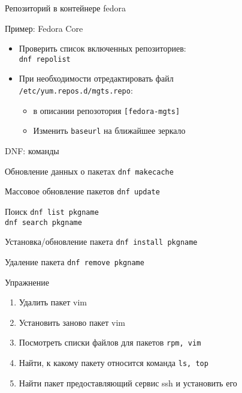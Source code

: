 \begin{frame}[fragile]{Репозиторий в контейнере fedora}
	\begin{block}{Пример: Fedora Core}
	\begin{itemize}
	    \item Проверить список включенных репозиториев: \\
	    {\tt dnf repolist}
	    \item При необходимости отредактировать файл \\
		        {\tt /etc/yum.repos.d/mgts.repo}:
		\begin{itemize}
		    \item в описании репозотория {\tt [fedora-mgts]}
		    \item Изменить {\tt baseurl} на ближайшее зеркало
		\end{itemize}
	\end{itemize}
	\end{block}
\end{frame}


\begin{frame}{DNF: команды}
	\begin{block}{Обновление данных о пакетах}
		{\tt dnf makecache}
	\end{block}
	\begin{block}{Массовое обновление пакетов}
		{\tt dnf update }
	\end{block}
	\begin{block}{Поиск}
		{\tt dnf list pkgname }\\
		{\tt dnf search pkgname }
	\end{block}
	\begin{block}{Установка/обновление пакета}
		{\tt dnf install pkgname }
	\end{block}
	\begin{block}{Удаление пакета}
		{\tt dnf remove pkgname }
	\end{block}
\end{frame}


\begin{frame}[fragile]{Упражнение}
  \begin{enumerate}
      \item Удалить пакет vim
      \item Установить заново пакет vim
      \item Посмотреть списки файлов для пакетов {\tt rpm, vim}
      \item Найти, к какому пакету относится команда {\tt ls, top}
      \item Найти пакет предоставляющий сервис ssh и установить его
    \end{enumerate}
\end{frame}

